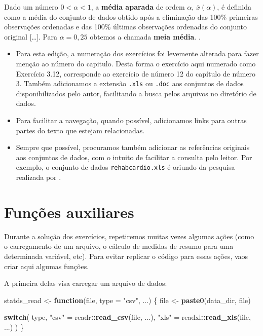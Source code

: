 \documentclass[
]{latex/krantz}
\newenvironment{Shaded}{\begin{snugshade}}{\end{snugshade}}
\newcommand{\AttributeTok}[1]{\textcolor[rgb]{0.13,0.29,0.53}{#1}}
\newcommand{\ControlFlowTok}[1]{\textcolor[rgb]{0.13,0.29,0.53}{\textbf{#1}}}
\newcommand{\FunctionTok}[1]{\textcolor[rgb]{0.13,0.29,0.53}{\textbf{#1}}}
\newcommand{\NormalTok}[1]{#1}
\newcommand{\OtherTok}[1]{\textcolor[rgb]{0.56,0.35,0.01}{#1}}
\newcommand{\SpecialCharTok}[1]{\textcolor[rgb]{0.81,0.36,0.00}{\textbf{#1}}}
\newcommand{\StringTok}[1]{\textcolor[rgb]{0.31,0.60,0.02}{#1}}
\providecommand{\tightlist}{%
  \setlength{\itemsep}{0pt}\setlength{\parskip}{0pt}}
\renewenvironment{quote}{\begin{VF}}{\end{VF}}
\theoremstyle{definition}
\theoremstyle{definition}
\theoremstyle{definition}
\theoremstyle{definition}
\theoremstyle{remark}
\begin{document}
\begin{quote}
Dado um número \(0 < \alpha < 1\), a \textbf{média aparada} de ordem \(\alpha\), \(\overline{x}(\alpha)\), é definida como a média do conjunto de dados obtido após a eliminação das 100\% primeiras observações ordenadas e das 100\% últimas observações ordenadas do conjunto original {[}\ldots{]}. Para \(\alpha = 0,25\) obtemos a chamada \textbf{meia média}. \citep[p.~47]{MorettinSinger2022}.
\end{quote}

\begin{itemize}
\tightlist
\item
  Para esta edição, a numeração dos exercícios foi levemente alterada para fazer menção ao número do capitulo. Desta forma o exercício aqui numerado como Exercício 3.12, corresponde ao exercício de número 12 do capítulo de número 3. Também adicionamos a extensão \texttt{.xls} ou \texttt{.doc} aos conjuntos de dados disponibilizados pelo autor, facilitando a busca pelos arquivos no diretório de dados.
\item
  Para facilitar a navegação, quando possível, adicionamos links para outras partes do texto que estejam relacionadas.
\item
  Sempre que possível, procuramos também adicionar as referências originais aos conjuntos de dados, com o intuito de facilitar a consulta pelo leitor. Por exemplo, o conjunto de dados \texttt{rehabcardio.xls} é oriundo da pesquisa realizada por \citet{CarvalhoEtAl2007}.
\end{itemize}

\hypertarget{funuxe7uxf5es-auxiliares}{%
\section*{Funções auxiliares}\label{funuxe7uxf5es-auxiliares}}

Durante a solução dos exercícios, repetiremos muitas vezes algumas ações (como o carregamento de um arquivo, o cálculo de medidas de resumo para uma determinada variável, etc). Para evitar replicar o código para essas ações, vaos criar aqui algumas funções.

A primeira delas visa carregar um arquivo de dados:

\begin{Shaded}
\begin{Highlighting}[]
\NormalTok{statds\_read }\OtherTok{\textless{}{-}} \ControlFlowTok{function}\NormalTok{(file, }\AttributeTok{type =} \StringTok{"csv"}\NormalTok{, ...) \{}
\NormalTok{  file }\OtherTok{\textless{}{-}} \FunctionTok{paste0}\NormalTok{(data\_dir, file)}
  
  \ControlFlowTok{switch}\NormalTok{(}
\NormalTok{    type,}
    \StringTok{"csv"} \OtherTok{=}\NormalTok{ readr}\SpecialCharTok{::}\FunctionTok{read\_csv}\NormalTok{(file, ...),}
    \StringTok{"xls"} \OtherTok{=}\NormalTok{ readxl}\SpecialCharTok{::}\FunctionTok{read\_xls}\NormalTok{(file, ...)}
\NormalTok{  )}
\NormalTok{\}}
\end{Highlighting}
\end{Shaded}
\end{document}
